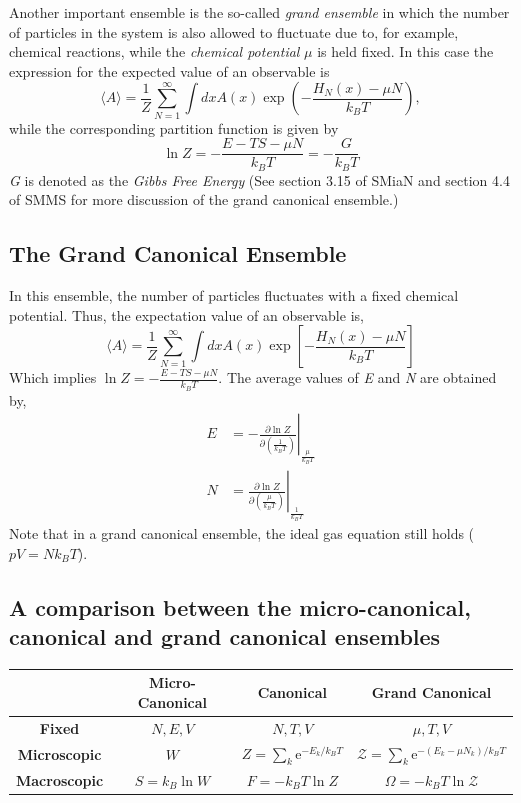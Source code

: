 \documentclass{article}
\begin{document}
Another important ensemble is the so-called \emph{grand ensemble} in which the number of particles in the system is also allowed to fluctuate due to, for example, chemical reactions, while the \emph{chemical potential} $\mu$ is held fixed. In this case the expression for the expected value of an observable is
$$
	\langle A \rangle = \frac{1}{Z} \sum_{N=1}^\infty \int dxA(x)\exp\left(-\frac{H_N(x)-\mu N}{k_BT}\right),
$$
while the corresponding partition function is given by
$$
	\ln Z = -\frac{E-TS-\mu N}{k_BT} = -\frac{G}{k_BT}
$$
{\it G} is denoted as the {\it Gibbs Free Energy}
(See section 3.15 of SMiaN and section 4.4 of SMMS for more discussion of the grand canonical ensemble.)

\subsection{The Grand Canonical Ensemble}

In this ensemble, the number of particles fluctuates with a fixed chemical potential. Thus, the expectation value of an observable is, 
$$\langle A \rangle = \frac{1}{Z} \sum_{N=1}^{\infty} \int dx A(x) \exp\left[-\frac{H_N(x) - \mu N}{k_B T}\right]$$
Which implies $\ln Z = -\frac{E-TS-\mu N}{k_B T}$. The average values of {\it E} and {\it N} are obtained by,
\begin{align*}
E &= \left.-\frac{\partial \ln Z}{\partial \left(\frac{1}{k_B T}\right)} \right|_{\frac{\mu}{k_B T}} \\
N &= \left.\frac{\partial \ln Z}{\partial \left(\frac{\mu}{k_B T}\right)} \right|_{\frac{1}{k_B T}}
\end{align*}
Note that in a grand canonical ensemble, the ideal gas equation still holds ($pV = N k_B T$).

\subsection{A comparison between the micro-canonical, canonical and grand canonical ensembles}

\begin{tabular}{cccc}
\toprule
& Micro-Canonical & Canonical & Grand Canonical \\
\midrule
{\bf Fixed} & $N, E, V$ & $N,T,V$ & $\mu , T, V$ \\

{\bf Microscopic} & $W$ & $Z = \sum_k \text{e}^{-E_k/k_BT}$ & $\mathcal{Z} = \sum_k \text{e}^{-(E_k-\mu N_k)/k_BT}$ \\
{\bf Macroscopic} & $S = k_B \ln W$ & $F = -k_B T \ln Z$ & $\Omega = -k_B T \ln \mathcal{Z}$ \\
\bottomrule
\end{tabular}
\end{document}
